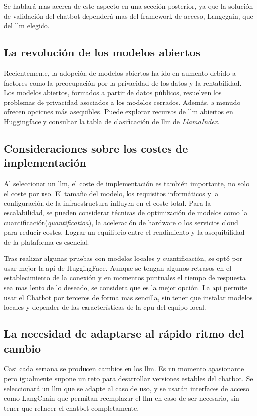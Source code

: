 Se hablará mas acerca de este aspecto en una sección posterior, ya que la solución de validación del chatbot dependerá mas del framework de acceso, Langcgain, que del \acrshort{llm} elegido.

\subsection{La revolución de los modelos abiertos}
Recientemente, la adopción de modelos abiertos ha ido en aumento debido a factores como la preocupación por la privacidad de los datos y la rentabilidad. Los modelos abiertos, formados a partir de datos públicos, resuelven los problemas de privacidad asociados a los modelos cerrados. Además, a menudo ofrecen opciones más asequibles. Puede explorar recursos de \acrshort{llm} abiertos en Huggingface y consultar la tabla de clasificación de \acrshort{llm} de \textit{LlamaIndex}\cite{LlamaIndex}.

\subsection{Consideraciones sobre los costes de implementación}
Al seleccionar un \acrshort{llm}, el coste de implementación es también importante, no solo el coste por uso. El tamaño del modelo, los requisitos informáticos y la configuración de la infraestructura influyen en el coste total. Para la escalabilidad, se pueden considerar técnicas de optimización de modelos como la cuantificación(\textit{quantification}), la aceleración de hardware o los servicios cloud para reducir costes. Lograr un equilibrio entre el rendimiento y la asequibilidad de la plataforma es esencial.

Tras realizar algunas pruebas con modelos locales y cuantificación, se optó por usar mejor la \acrshort{api} de HuggingFace. Aunque se tengan algunos retrasos en el establecimiento de la conexión y en momentos puntuales el tiempo de respuesta sea mas lento de lo deseado, se considera que es la mejor opción. La \acrshort{api} permite usar el Chatbot por terceros de forma mas sencilla, sin tener que instalar modelos locales y depender de las características de la \acrshort{cpu} del equipo local.

\subsection{La necesidad de adaptarse al rápido ritmo del cambio}
Casi cada semana se producen cambios en los \acrshort{llm}. Es un momento apasionante pero igualmente supone un reto para desarrollar versiones estables del chatbot. Se seleccionará un \acrshort{llm} que se adapte al caso de uso, y se usarán interfaces de acceso como LangChain que permitan reemplazar el \acrshort{llm} en caso de ser necesario, sin tener que rehacer el chatbot completamente.

